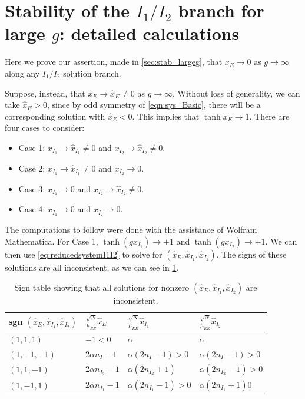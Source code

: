 \documentclass[reqno]{siamonline190516}
\begin{document}
\section{Stability of the \texorpdfstring{$I_1/I_2$}{I1/I2} branch for large \texorpdfstring{$g$}{g}: detailed calculations }\label{app:stab_largeg} 

Here we prove our assertion, made in \cref{sec:stab_largeg}, that $x_E \rightarrow 0$ as $g\rightarrow \infty$ along any $I_1/I_2$ solution branch.

Suppose, instead, that $x_E \rightarrow \hat{x}_E \neq 0$ as $g \rightarrow \infty$. Without loss of generality, we can take $\hat{x}_E > 0$, since by odd symmetry of \cref{eqn:sys_Basic}, there will be a corresponding solution with $\hat{x}_E < 0$. This implies that $\tanh x_{E} \rightarrow 1$. There are four cases to consider:\\
\begin{itemize}
    \item Case 1: $x_{I_1} \rightarrow \hat{x}_{I_1} \neq 0$ and $x_{I_2} \rightarrow \hat{x}_{I_2} \neq 0$.
    \item Case 2: $x_{I_1} \rightarrow \hat{x}_{I_1} \neq 0$ and $x_{I_2} \rightarrow 0$.
    \item Case 3: $x_{I_1} \rightarrow 0$ and $x_{I_2} \rightarrow \hat{x}_{I_2} \neq 0$.
    \item Case 4: $x_{I_1} \rightarrow 0$ and $x_{I_2} \rightarrow 0$.\\
\end{itemize}

The computations to follow were done with the assistance of Wolfram Mathematica. For Case 1, $\tanh(g x_{I_1}) \rightarrow \pm 1$ and $\tanh(g x_{I_2}) \rightarrow \pm 1$. We can then use \cref{eq:reducedsystemI1I2} to solve for $(\hat{x}_E, \hat{x}_{I_1}, \hat{x}_{I_2})$. The signs of these solutions are all inconsistent, as we can see in \cref{table:signtable}. 

\begin{table}
\centering
    \begin{tabular}{llll}
        \toprule
        sgn $(\hat{x}_E, \hat{x}_{I_1}, \hat{x}_{I_2})$ & $\frac{\sqrt{N}}{\mu_{EE}}\hat{x}_E$ & $\frac{\sqrt{N}}{\mu_{EE}}\hat{x}_{I_1}$ & $\frac{\sqrt{N}}{\mu_{EE}}\hat{x}_{I_2}$ \\
        \midrule
        $(1,1,1)$   & $-1 < 0$ & $\alpha$ & $\alpha$ \\
        $(1,-1,-1)$ & $2 \alpha n_I - 1$ & $\alpha(2 n_I - 1) > 0 $ & $\alpha(2 n_I - 1) > 0$ \\
        $(1,1,-1)$  & $2 \alpha n_{I_2} - 1$ & $\alpha(2 n_{I_2} + 1)$ & $\alpha(2 n_{I_2} - 1) > 0$  \\
        $(1,-1,1)$  & $2 \alpha n_{I_1} - 1$ & $\alpha(2 n_{I_1} - 1) > 0$ & $\alpha(2 n_{I_1} + 1)0$  \\
        \bottomrule
    \end{tabular}
    \label{table:signtable}
    \vspace{0.25cm}
    \caption{Sign table showing that all solutions for nonzero $(\hat{x}_E, \hat{x}_{I_1}, \hat{x}_{I_2})$ are inconsistent.}
\end{table}
\end{document}
